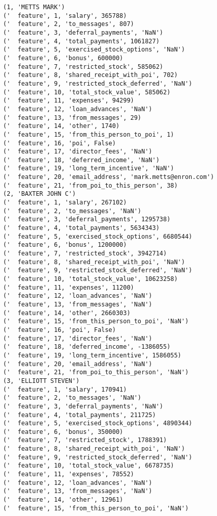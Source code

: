 \begin{verbatim}
(1, 'METTS MARK')
('  feature', 1, 'salary', 365788)
('  feature', 2, 'to_messages', 807)
('  feature', 3, 'deferral_payments', 'NaN')
('  feature', 4, 'total_payments', 1061827)
('  feature', 5, 'exercised_stock_options', 'NaN')
('  feature', 6, 'bonus', 600000)
('  feature', 7, 'restricted_stock', 585062)
('  feature', 8, 'shared_receipt_with_poi', 702)
('  feature', 9, 'restricted_stock_deferred', 'NaN')
('  feature', 10, 'total_stock_value', 585062)
('  feature', 11, 'expenses', 94299)
('  feature', 12, 'loan_advances', 'NaN')
('  feature', 13, 'from_messages', 29)
('  feature', 14, 'other', 1740)
('  feature', 15, 'from_this_person_to_poi', 1)
('  feature', 16, 'poi', False)
('  feature', 17, 'director_fees', 'NaN')
('  feature', 18, 'deferred_income', 'NaN')
('  feature', 19, 'long_term_incentive', 'NaN')
('  feature', 20, 'email_address', 'mark.metts@enron.com')
('  feature', 21, 'from_poi_to_this_person', 38)
(2, 'BAXTER JOHN C')
('  feature', 1, 'salary', 267102)
('  feature', 2, 'to_messages', 'NaN')
('  feature', 3, 'deferral_payments', 1295738)
('  feature', 4, 'total_payments', 5634343)
('  feature', 5, 'exercised_stock_options', 6680544)
('  feature', 6, 'bonus', 1200000)
('  feature', 7, 'restricted_stock', 3942714)
('  feature', 8, 'shared_receipt_with_poi', 'NaN')
('  feature', 9, 'restricted_stock_deferred', 'NaN')
('  feature', 10, 'total_stock_value', 10623258)
('  feature', 11, 'expenses', 11200)
('  feature', 12, 'loan_advances', 'NaN')
('  feature', 13, 'from_messages', 'NaN')
('  feature', 14, 'other', 2660303)
('  feature', 15, 'from_this_person_to_poi', 'NaN')
('  feature', 16, 'poi', False)
('  feature', 17, 'director_fees', 'NaN')
('  feature', 18, 'deferred_income', -1386055)
('  feature', 19, 'long_term_incentive', 1586055)
('  feature', 20, 'email_address', 'NaN')
('  feature', 21, 'from_poi_to_this_person', 'NaN')
(3, 'ELLIOTT STEVEN')
('  feature', 1, 'salary', 170941)
('  feature', 2, 'to_messages', 'NaN')
('  feature', 3, 'deferral_payments', 'NaN')
('  feature', 4, 'total_payments', 211725)
('  feature', 5, 'exercised_stock_options', 4890344)
('  feature', 6, 'bonus', 350000)
('  feature', 7, 'restricted_stock', 1788391)
('  feature', 8, 'shared_receipt_with_poi', 'NaN')
('  feature', 9, 'restricted_stock_deferred', 'NaN')
('  feature', 10, 'total_stock_value', 6678735)
('  feature', 11, 'expenses', 78552)
('  feature', 12, 'loan_advances', 'NaN')
('  feature', 13, 'from_messages', 'NaN')
('  feature', 14, 'other', 12961)
('  feature', 15, 'from_this_person_to_poi', 'NaN')

\end{verbatim}
